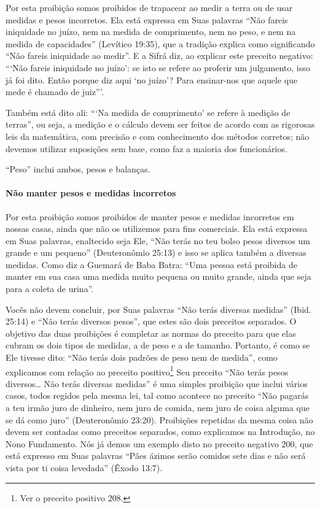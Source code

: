 Por esta proibição somos proibidos de trapacear ao medir a terra ou de
usar medidas e pesos incorretos. Ela está expressa em Suas palavras
``Não fareis iniquidade no juízo, nem na medida de comprimento, nem no
peso, e nem na medida de capacidades'' (Levítico 19:35), que a tradição
explica como significando ``Não fareis iniquidade ao medir''. E a Sifrá
diz, ao explicar este preceito negativo: ```Não fareis iniquidade no
juízo': se isto se refere ao proferir um julgamento, isso já foi dito.
Então porque diz aqui `no juízo'? Para ensinar-nos que aquele que mede é
chamado de juiz'''.

Também está dito ali: ```Na medida de comprimento' se refere à medição
de terras'', ou seja, a medição e o cálculo devem ser feitos de acordo
com as rigorosas leis da matemática, com precisão e com conhecimento dos
métodos corretos; não devemos utilizar suposições sem base, como faz a
maioria dos funcionários.

``Peso'' inclui ambos, pesos e balanças.

\paragraph{Não manter pesos e medidas incorretos}

Por esta proibição somos proibidos de manter pesos e medidas incorretos
em nossas casas, ainda que não os utilizemos para fins comerciais. Ela
está expressa em Suas palavras, enaltecido seja Ele, ``Não terás no teu
bolso pesos diversos um grande e um pequeno'' (Deuteronômio 25:13) e
isso se aplica também a diversas medidas. Como diz a Guemará de Baba
Batra: ``Uma pessoa está proibida de manter em sua casa uma medida muito
pequena ou muito grande, ainda que seja para a coleta de urina''.

Vocês não devem concluir, por Suas palavras ``Não terás diversas
medidas'' (Ibid. 25:14) e ``Não terás diversos pesos'', que estes são
dois preceitos separados. O objetivo das duas proibições é completar as
normas do preceito para que elas cubram os dois tipos de medidas, a de
peso e a de tamanho. Portanto, é como se Ele tivesse dito: ``Não terás
dois padrões de peso nem de medida'', como explicamos com relação ao
preceito positivo\footnote{Ver o preceito positivo 208.} Seu preceito ``Não terás pesos
diversos\ldots{} Não terás diversas medidas'' é uma simples proibição que
inclui vários casos, todos regidos pela mesma lei, tal como acontece no
preceito ``Não pagarás a teu irmão juro de dinheiro, nem juro de comida,
nem juro de coisa alguma que se dá como juro'' (Deuteronômio 23:20).
Proibições repetidas da mesma coisa não devem ser contadas como
preceitos separados, como explicamos na Introdução, no Nono Fundamento.
Nós já demos um exemplo disto no preceito negativo 200, que está
expresso em Suas palavras ``Pães ázimos serão comidos sete dias e não
será vista por ti coisa levedada'' (Êxodo 13:7).

